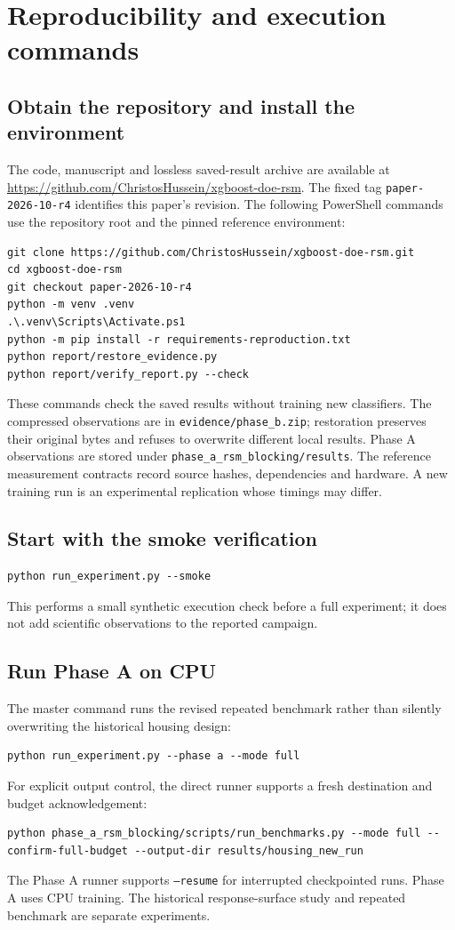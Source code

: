 \documentclass[12pt,a4paper]{article}
\begin{document}
\section{Reproducibility and execution commands}\label{app:execution}
\subsection{Obtain the repository and install the environment}
The code, manuscript and lossless saved-result archive are available at \url{https://github.com/ChristosHussein/xgboost-doe-rsm}. The fixed tag \texttt{paper-2026-10-r4} identifies this paper's revision. The following PowerShell commands use the repository root and the pinned reference environment:
\begin{lstlisting}
git clone https://github.com/ChristosHussein/xgboost-doe-rsm.git
cd xgboost-doe-rsm
git checkout paper-2026-10-r4
python -m venv .venv
.\.venv\Scripts\Activate.ps1
python -m pip install -r requirements-reproduction.txt
python report/restore_evidence.py
python report/verify_report.py --check
\end{lstlisting}
These commands check the saved results without training new classifiers. The compressed observations are in \texttt{evidence/phase\_b.zip}; restoration preserves their original bytes and refuses to overwrite different local results. Phase A observations are stored under \texttt{phase\_a\_rsm\_blocking/results}. The reference measurement contracts record source hashes, dependencies and hardware. A new training run is an experimental replication whose timings may differ.
\subsection{Start with the smoke verification}
\begin{lstlisting}
python run_experiment.py --smoke
\end{lstlisting}
This performs a small synthetic execution check before a full experiment; it does not add scientific observations to the reported campaign.
\subsection{Run Phase A on CPU}
The master command runs the revised repeated benchmark rather than silently overwriting the historical housing design:
\begin{lstlisting}
python run_experiment.py --phase a --mode full
\end{lstlisting}
For explicit output control, the direct runner supports a fresh destination and budget acknowledgement:
\begin{lstlisting}
python phase_a_rsm_blocking/scripts/run_benchmarks.py --mode full --confirm-full-budget --output-dir results/housing_new_run
\end{lstlisting}
The Phase A runner supports \texttt{--resume} for interrupted checkpointed runs. Phase A uses CPU training. The historical response-surface study and repeated benchmark are separate experiments.
\end{document}
